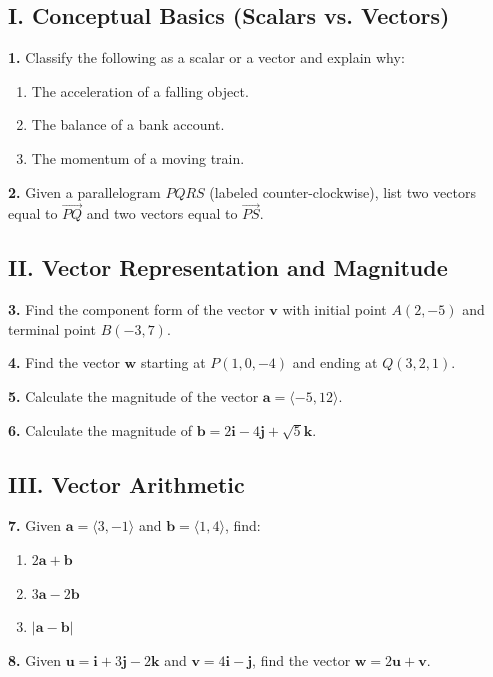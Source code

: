 \documentclass[12pt]{article}
\begin{document}
\subsection*{I. Conceptual Basics (Scalars vs. Vectors)}
\textbf{1.} Classify the following as a scalar or a vector and explain why:
\begin{enumerate}[label=(\alph*)]
    \item The acceleration of a falling object.
    \item The balance of a bank account.
    \item The momentum of a moving train.
\end{enumerate}

\textbf{2.} Given a parallelogram $PQRS$ (labeled counter-clockwise), list two vectors equal to $\vec{PQ}$ and two vectors equal to $\vec{PS}$.

\subsection*{II. Vector Representation and Magnitude}
\textbf{3.} Find the component form of the vector $\mathbf{v}$ with initial point $A(2, -5)$ and terminal point $B(-3, 7)$.

\textbf{4.} Find the vector $\mathbf{w}$ starting at $P(1, 0, -4)$ and ending at $Q(3, 2, 1)$.

\textbf{5.} Calculate the magnitude of the vector $\mathbf{a} = \langle -5, 12 \rangle$.

\textbf{6.} Calculate the magnitude of $\mathbf{b} = 2\mathbf{i} - 4\mathbf{j} + \sqrt{5}\mathbf{k}$.

\subsection*{III. Vector Arithmetic}
\textbf{7.} Given $\mathbf{a} = \langle 3, -1 \rangle$ and $\mathbf{b} = \langle 1, 4 \rangle$, find:
\begin{enumerate}[label=(\alph*)]
    \item $2\mathbf{a} + \mathbf{b}$
    \item $3\mathbf{a} - 2\mathbf{b}$
    \item $|\mathbf{a} - \mathbf{b}|$
\end{enumerate}

\textbf{8.} Given $\mathbf{u} = \mathbf{i} + 3\mathbf{j} - 2\mathbf{k}$ and $\mathbf{v} = 4\mathbf{i} - \mathbf{j}$, find the vector $\mathbf{w} = 2\mathbf{u} + \mathbf{v}$.
\end{document}
